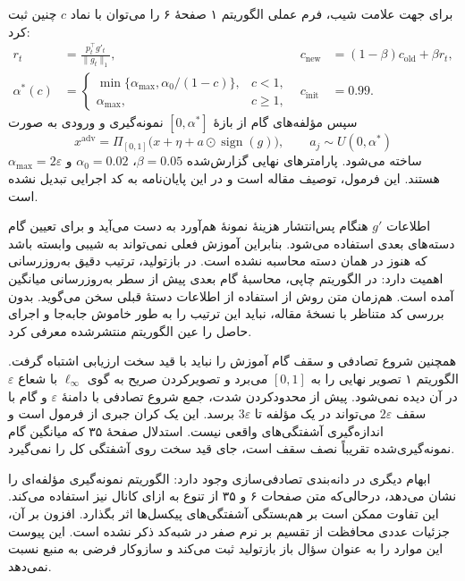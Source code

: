 برای جهت علامت شیب، فرم عملی الگوریتم ۱ صفحهٔ ۶ را می‌توان با نماد $c$ چنین ثبت کرد:
\begin{align}
 r_t&=\frac{p_t^\top g'_t}{\|g_t\|_1},
 &c_{\mathrm{new}}&=(1-\beta)c_{\mathrm{old}}+\beta r_t,\\
 \alpha^*(c)&=
 \begin{cases}
 \min\{\alpha_{\max},\alpha_0/(1-c)\},&c<1,\\
 \alpha_{\max},&c\geq1,
 \end{cases}
 &c_{\mathrm{init}}&=0.99.
 \label{eq:app-adaptive}
\end{align}
سپس مؤلفه‌های گام از بازهٔ $[0,\alpha^*]$ نمونه‌گیری و ورودی به صورت
\begin{equation}
 x^{\mathrm{adv}}=\Pi_{[0,1]}\bigl(x+\eta+a\odot\operatorname{sign}(g)\bigr),
 \qquad a_j\sim U(0,\alpha^*)
 \label{eq:app-generation}
\end{equation}
ساخته می‌شود. پارامترهای نهایی گزارش‌شده $\beta=0.05$، $\alpha_0=0.02$ و $\alpha_{\max}=2\varepsilon$ هستند. این فرمول، توصیف مقاله است و در این پایان‌نامه به کد اجرایی تبدیل نشده است.

اطلاعات $g'$ هنگام پس‌انتشار هزینهٔ نمونهٔ هم‌آورد به دست می‌آید و برای تعیین گام دسته‌های بعدی استفاده می‌شود. بنابراین آموزش فعلی نمی‌تواند به شیبی وابسته باشد که هنوز در همان دسته محاسبه نشده است. در بازتولید، ترتیب دقیق به‌روزرسانی اهمیت دارد: در الگوریتم چاپی، محاسبهٔ گام بعدی پیش از سطر به‌روزرسانی میانگین آمده است. هم‌زمان متن روش از استفاده از اطلاعات دستهٔ قبلی سخن می‌گوید. بدون بررسی کد متناظر با نسخهٔ مقاله، نباید این ترتیب را به طور خاموش جابه‌جا و اجرای حاصل را عین الگوریتم منتشرشده معرفی کرد.

همچنین شروع تصادفی و سقف گام آموزش را نباید با قید سخت ارزیابی اشتباه گرفت. الگوریتم ۱ تصویر نهایی را به $[0,1]$ می‌برد و تصویرکردن صریح به گوی $\ell_\infty$ با شعاع $\varepsilon$ در آن دیده نمی‌شود. پیش از محدودکردن شدت، جمع شروع تصادفی با دامنهٔ $\varepsilon$ و گام با سقف $2\varepsilon$ می‌تواند در یک مؤلفه تا $3\varepsilon$ برسد. این یک کران جبری از فرمول است و اندازه‌گیری آشفتگی‌های واقعی نیست. استدلال صفحهٔ ۳۵ که میانگین گام نمونه‌گیری‌شده تقریباً نصف سقف است، جای قید سخت روی آشفتگی کل را نمی‌گیرد.

ابهام دیگری در دانه‌بندی تصادفی‌سازی وجود دارد: الگوریتم نمونه‌گیری مؤلفه‌ای را نشان می‌دهد، درحالی‌که متن صفحات ۶ و ۳۵ از تنوع به ازای کانال نیز استفاده می‌کند. این تفاوت ممکن است بر هم‌بستگی آشفتگی‌های پیکسل‌ها اثر بگذارد. افزون بر آن، جزئیات عددی محافظت از تقسیم بر نرم صفر در شبه‌کد ذکر نشده است. این پیوست این موارد را به عنوان سؤال باز بازتولید ثبت می‌کند و سازوکار فرضی به منبع نسبت نمی‌دهد.

